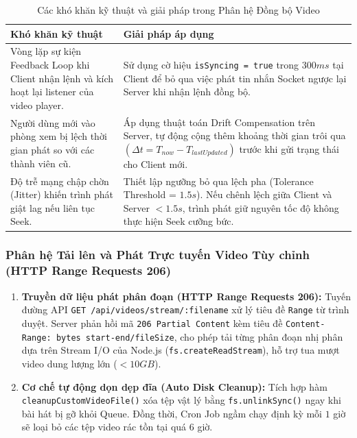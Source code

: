 \documentclass[12pt,a4paper]{extarticle}
\begin{document}
\begin{table}[H]
\centering
\small
\caption{Các khó khăn kỹ thuật và giải pháp trong Phân hệ Đồng bộ Video}
\label{tab:sync_problems}
\renewcommand{\arraystretch}{1.35}
\begin{tabular}{|p{5.5cm}|p{8.5cm}|}
\hline
\textbf{Khó khăn kỹ thuật} & \textbf{Giải pháp áp dụng} \\ \hline
Vòng lặp sự kiện Feedback Loop khi Client nhận lệnh và kích hoạt lại listener của video player. & Sử dụng cờ hiệu \texttt{isSyncing = true} trong $300ms$ tại Client để bỏ qua việc phát tin nhắn Socket ngược lại Server khi nhận lệnh đồng bộ. \\ \hline
Người dùng mới vào phòng xem bị lệch thời gian phát so với các thành viên cũ. & Áp dụng thuật toán Drift Compensation trên Server, tự động cộng thêm khoảng thời gian trôi qua $(\Delta t = T_{now} - T_{lastUpdated})$ trước khi gửi trạng thái cho Client mới. \\ \hline
Độ trễ mạng chập chờn (Jitter) khiến trình phát giật lag nếu liên tục Seek. & Thiết lập ngưỡng bỏ qua lệch pha (Tolerance Threshold = $1.5s$). Nếu chênh lệch giữa Client và Server $< 1.5s$, trình phát giữ nguyên tốc độ không thực hiện Seek cưỡng bức. \\ \hline
\end{tabular}
\end{table}


\subsubsection{Phân hệ Tải lên và Phát Trực tuyến Video Tùy chỉnh (HTTP Range Requests 206)}
\begin{enumerate}[leftmargin=1.2cm]
    \item \textbf{Truyền dữ liệu phát phân đoạn (HTTP Range Requests 206):} Tuyến đường API \texttt{GET /api/videos/stream/:filename} xử lý tiêu đề \texttt{Range} từ trình duyệt. Server phản hồi mã \texttt{206 Partial Content} kèm tiêu đề \texttt{Content-Range: bytes start-end/fileSize}, cho phép tải từng phân đoạn nhị phân dựa trên Stream I/O của Node.js (\texttt{fs.createReadStream}), hỗ trợ tua mượt video dung lượng lớn ($<10GB$).
    \item \textbf{Cơ chế tự động dọn dẹp đĩa (Auto Disk Cleanup):} Tích hợp hàm \texttt{cleanupCustomVideoFile()} xóa tệp vật lý bằng \texttt{fs.unlinkSync()} ngay khi bài hát bị gỡ khỏi Queue. Đồng thời, Cron Job ngầm chạy định kỳ mỗi $1$ giờ sẽ loại bỏ các tệp video rác tồn tại quá $6$ giờ.
\end{enumerate}
\end{document}
